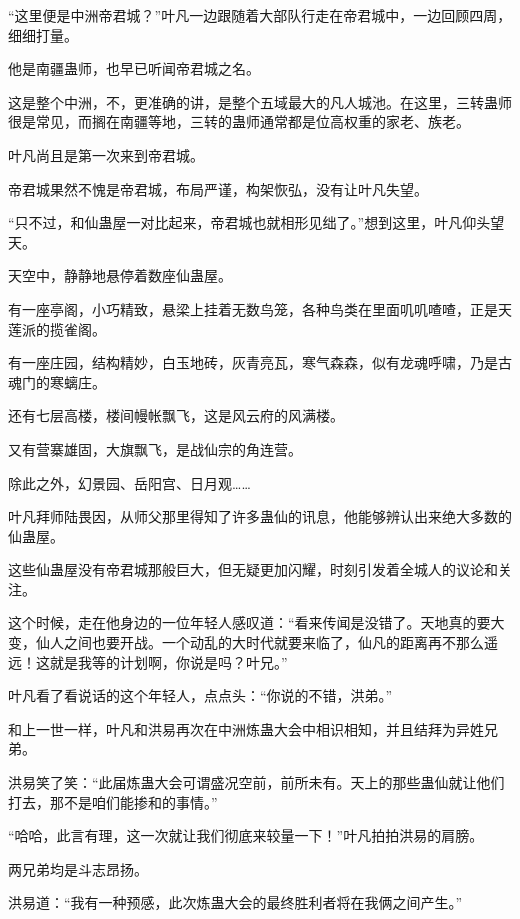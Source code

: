 
\begin{this_body}

“这里便是中洲帝君城？”叶凡一边跟随着大部队行走在帝君城中，一边回顾四周，细细打量。

他是南疆蛊师，也早已听闻帝君城之名。

这是整个中洲，不，更准确的讲，是整个五域最大的凡人城池。在这里，三转蛊师很是常见，而搁在南疆等地，三转的蛊师通常都是位高权重的家老、族老。

叶凡尚且是第一次来到帝君城。

帝君城果然不愧是帝君城，布局严谨，构架恢弘，没有让叶凡失望。

“只不过，和仙蛊屋一对比起来，帝君城也就相形见绌了。”想到这里，叶凡仰头望天。

天空中，静静地悬停着数座仙蛊屋。

有一座亭阁，小巧精致，悬梁上挂着无数鸟笼，各种鸟类在里面叽叽喳喳，正是天莲派的揽雀阁。

有一座庄园，结构精妙，白玉地砖，灰青亮瓦，寒气森森，似有龙魂呼啸，乃是古魂门的寒螭庄。

还有七层高楼，楼间幔帐飘飞，这是风云府的风满楼。

又有营寨雄固，大旗飘飞，是战仙宗的角连营。

除此之外，幻景园、岳阳宫、日月观……

叶凡拜师陆畏因，从师父那里得知了许多蛊仙的讯息，他能够辨认出来绝大多数的仙蛊屋。

这些仙蛊屋没有帝君城那般巨大，但无疑更加闪耀，时刻引发着全城人的议论和关注。

这个时候，走在他身边的一位年轻人感叹道：“看来传闻是没错了。天地真的要大变，仙人之间也要开战。一个动乱的大时代就要来临了，仙凡的距离再不那么遥远！这就是我等的计划啊，你说是吗？叶兄。”

叶凡看了看说话的这个年轻人，点点头：“你说的不错，洪弟。”

和上一世一样，叶凡和洪易再次在中洲炼蛊大会中相识相知，并且结拜为异姓兄弟。

洪易笑了笑：“此届炼蛊大会可谓盛况空前，前所未有。天上的那些蛊仙就让他们打去，那不是咱们能掺和的事情。”

“哈哈，此言有理，这一次就让我们彻底来较量一下！”叶凡拍拍洪易的肩膀。

两兄弟均是斗志昂扬。

洪易道：“我有一种预感，此次炼蛊大会的最终胜利者将在我俩之间产生。”


\end{this_body}
